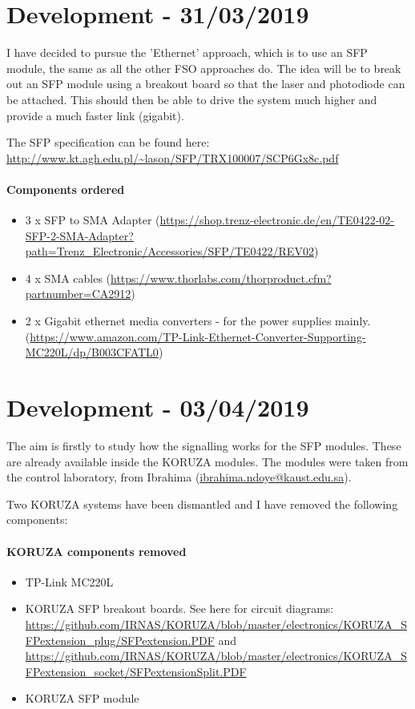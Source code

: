 \section{Development - 31/03/2019}
I have decided to pursue the 'Ethernet' approach, which is to use an \ac{SFP}
module, the same as all the other \ac{FSO} approaches do. The idea will be
to break out an \ac{SFP} module using a breakout board so that the laser
and photodiode can be attached. This should then be able to drive the system
much higher and provide a much faster link (gigabit).

The \ac{SFP} specification can be found here:
\url{http://www.kt.agh.edu.pl/~lason/SFP/TRX100007/SCP6Gx8c.pdf}

\paragraph{\textbf{Components ordered}}
\begin{itemize}
\item{3 x \ac{SFP} to SMA Adapter
(\url{https://shop.trenz-electronic.de/en/TE0422-02-SFP-2-SMA-Adapter?path=Trenz_Electronic/Accessories/SFP/TE0422/REV02})}
\item{4 x SMA cables
(\url{https://www.thorlabs.com/thorproduct.cfm?partnumber=CA2912})}
\item{2 x Gigabit ethernet media converters - for the power supplies mainly.
(\url{https://www.amazon.com/TP-Link-Ethernet-Converter-Supporting-MC220L/dp/B003CFATL0})}
\end{itemize}

\section{Development - 03/04/2019}
The aim is firstly to study how the signalling works for the \ac{SFP}
modules. These are already available inside the KORUZA modules. The modules
were taken from the control laboratory, from Ibrahima
(\href{mailto:ibrahima.ndoye@kaust.edu.sa}{ibrahima.ndoye@kaust.edu.sa}).

Two KORUZA systems have been dismantled and I have removed the following
components:

\paragraph{\textbf{KORUZA components removed}}
\begin{itemize}
\item{TP-Link MC220L}
\item{KORUZA \ac{SFP} breakout boards. See here for circuit diagrams:
\url{https://github.com/IRNAS/KORUZA/blob/master/electronics/KORUZA_SFPextension_plug/SFPextension.PDF}
and \url{https://github.com/IRNAS/KORUZA/blob/master/electronics/KORUZA_SFPextension_socket/SFPextensionSplit.PDF}}
\item{KORUZA \ac{SFP} module}
\end{itemize}

